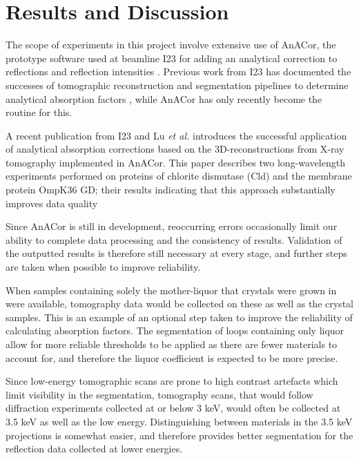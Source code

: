 \section{Results and Discussion}

The scope of experiments in this project involve extensive use of AnACor, the prototype software used at beamline I23 for adding an analytical correction to reflections and reflection intensities \cite{Lu}. Previous work from I23 has documented the successes of tomographic reconstruction and segmentation pipelines to determine analytical absorption factors \cite{Kazantsev2021}, while AnACor has only recently become the routine for this.

A recent publication from I23 and Lu \textit{et al.} \cite{Lu2024} introduces the successful application of analytical absorption corrections based on the 3D-reconstructions from X-ray tomography implemented in AnACor. This paper describes two long-wavelength experiments performed on proteins of chlorite dismutase (Cld) and the membrane protein OmpK36 GD; their results indicating that this approach substantially improves data quality 

Since AnACor is still in development, reoccurring errors occasionally limit our ability to complete data processing and the consistency of results. Validation of the outputted results is therefore still necessary at every stage, and further steps are taken when possible to improve reliability.

When samples containing solely the mother-liquor that crystals were grown in were available, tomography data would be collected on these as well as the crystal samples. This is an example of an optional step taken to improve the reliability of calculating absorption factors. The segmentation of loops containing only liquor allow for more reliable thresholds to be applied as there are fewer materials to account for, and therefore the liquor coefficient is expected to be more precise.

Since low-energy tomographic scans are prone to high contrast artefacts which limit visibility in the segmentation, tomography scans, that would follow diffraction experiments collected at or below 3 \unit{keV}, would often be collected at 3.5 \unit{keV} as well as the low energy. Distinguishing between materials in the 3.5 \unit{keV} projections is somewhat easier, and therefore provides better segmentation for the reflection data collected at lower energies.


